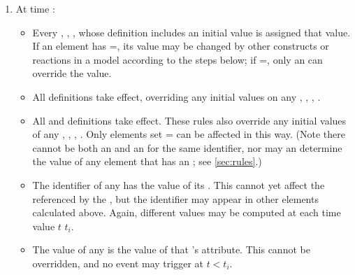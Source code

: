 \begin{enumerate}

\item At time :
  \begin{itemize}
    
  \item Every \Species, \SpeciesReference, \Compartment,  whose
    definition includes an initial value is assigned that value.
    If an element has =, its
    value may be changed by other constructs or reactions in a
    model according to the steps below; if
    =, only an \InitialAssignment can
    override the value.
    
  \item All \InitialAssignment definitions take effect,
    overriding any initial values on any \Species, \SpeciesReference,
    \Compartment, .  

  \item All \AssignmentRule and \AlgebraicRule definitions take effect.  These rules also override any initial values of any \Species, \SpeciesReference, \Compartment, .  Only elements set = can be affected in this way.  (Note there cannot be both an \AssignmentRule and an \InitialAssignment for the same identifier, nor may an \AlgebraicRule determine the value of any element that has an \InitialAssignment; see \ref{sec:rules}.)

  \item The identifier of any \Reaction has the value of its \KineticLaw.  This cannot yet affect the \Species referenced by the \Reaction, but the identifier may appear in other \Math elements calculated above.  Again, different values may be computed at each time value $t$ \leq $t_i$.

  \item The value of any \Event \Trigger is the value of that \Trigger's  attribute.  This cannot be overridden, and no event may trigger at $t < t_i$.

  \end{itemize}


\end{enumerate}
